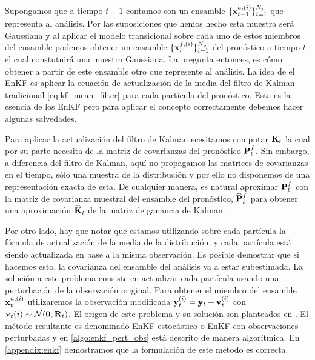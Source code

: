 Supongamos que a tiempo $t-1$ contamos con un ensamble $\{ \mathbf{x}_{t-1}^{a, (i)} \}_{i=1}^{N_p}$ que representa al análisis. Por las suposiciones que hemos hecho esta muestra será Gaussiana y al aplicar el modelo transicional sobre cada uno de estos miembros del ensamble podemos obtener un ensamble $\{ \mathbf{x}_{t}^{f, (i)} \}_{i=1}^{N_p}$ del pronóstico a tiempo $t$ el cual constutuirá una muestra Gaussiana. La pregunta entonces, es cómo obtener a partir de este ensamble otro que represente al análisis. La idea de el EnKF es aplicar la ecuación de actualización de la media del filtro de Kalman tradicional \ref{eq:kf_mean_filter} para cada partícula del pronóstico. Esta es la esencia de los EnKF pero para aplicar el concepto correctamente debemos hacer algunas salvedades.

Para aplicar la actualización del filtro de Kalman ecesitamos computar $\mathbf{K}_t$ la cual por su parte necesita de la matriz de covarianzas del pronóstico $\mathbf{P}_t^f$. Sin embargo, a diferencia del filtro de Kalman, aquí no propagamos las matrices de covarianzas en el tiempo, sólo una muestra de la distribución y por ello no disponemos de una representación exacta de esta. De cualquier manera, es natural aproximar $\mathbf{P}_t^f$ con la matriz de covarianza muestral del ensamble del pronóstico, $\widehat{\mathbf{P}}_t^f$ para obtener una aproximación $\widehat{\mathbf{K}}_t$ de la matriz de ganancia de Kalman.

Por otro lado, hay que notar que estamos utilizando sobre cada partícula la fórmula de actualización de la media de la distribución, y cada partícula está siendo actualizada en base a la misma observación. Es posible demostrar que si hacemos esto, la covarianza del ensamble del análisis va a estar subestimada. La solución a este problema consiste en actualizar cada partícula usando una perturbación de la observación original. Para obtener el miembro del ensamble $\mathbf{x}_t^{a, (i)}$ utilizaremos la observación modificada $\mathbf{y}_t^{(i)} = \mathbf{y}_t + \mathbf{v}_t^{(i)}$ con $\mathbf{v}_t{(i)} \sim \mathcal{N}(\mathbf{0}, \mathbf{R}_t)$. El origen de este problema y su solución son planteados en \cite{Burgers1998}. El método resultante es denominado EnKF estocástico o EnKF con observaciones perturbadas y en \ref{algo:enkf_pert_obs} está descrito de manera algorítmica. En \ref{appendix:enkf} demostramos que la formulación de este método es correcta.

